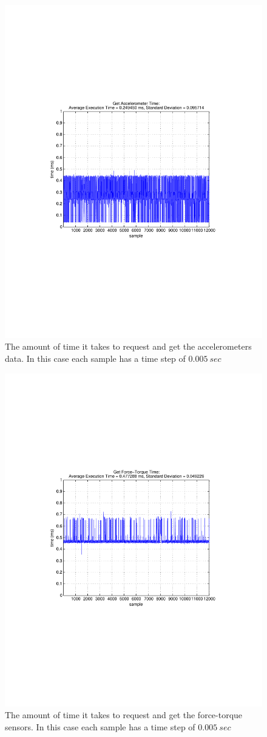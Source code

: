 \begin{figure}[thpb]
  \centering
\includegraphics[width=0.6\columnwidth]{./timingData/getAcc.pdf}
  \caption{The amount of time it takes to request and get the accelerometers data.  In this case each sample has a time step of $0.005~sec$}
  \label{fig:timing-acc}
\end{figure}



\begin{figure}[thpb]
  \centering
\includegraphics[width=0.6\columnwidth]{./timingData/getFt.pdf}
  \caption{The amount of time it takes to request and get the force-torque sensors.  In this case each sample has a time step of $0.005~sec$}
  \label{fig:timing-ft}
\end{figure}


